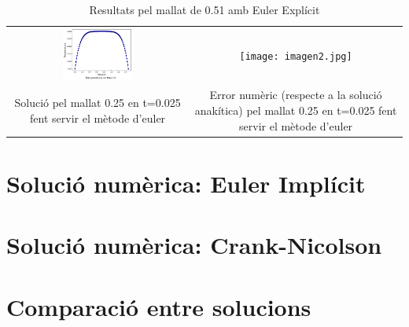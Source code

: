 \documentclass{article}
\begin{document}
\begin{table}[h]
    \centering
    \caption{Resultats pel mallat de 0.51 amb Euler Explícit}
    \label{tab:euler_at1}
    \begin{tabular}{cc}
        \includegraphics[width=0.4\textwidth]{images/T_vs_z_at3.png} &
        \texttt{[image: imagen2.jpg]} \\
        
        \parbox{0.4\textwidth}{\centering Solució pel mallat 0.25 en t=0.025 fent servir el mètode d'euler} &
        \parbox{0.4\textwidth}{\centering Error numèric (respecte a la solució anakítica) pel mallat 0.25 en t=0.025 fent servir el mètode d'euler} \\
 
    \end{tabular}
\end{table}

\section{Solució numèrica: Euler Implícit}
\section{Solució numèrica: Crank-Nicolson}
\section{Comparació entre solucions}
\end{document}
